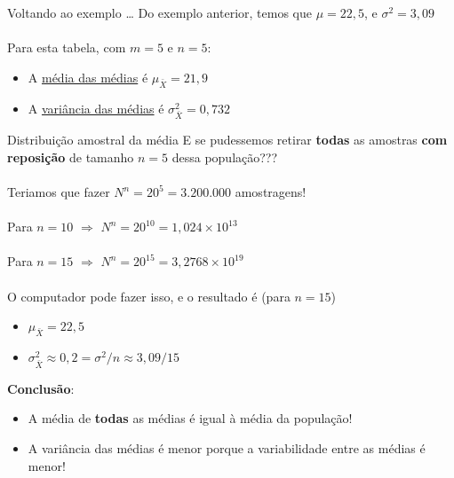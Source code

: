 \documentclass[10pt]{beamer}\usepackage[]{graphicx}\usepackage[]{color}
\theoremstyle{definition}
\begin{document}
\begin{frame}{Voltando ao exemplo \ldots}
  Do exemplo anterior, temos que $\mu = 22,5$, e $\sigma^2 = 3,09$\\~\\
  Para esta tabela, com $m=5$ e $n=5$:
  \begin{itemize}
  \item A \underline{média das médias} é $\mu_{\bar{X}} = 21,9$
  \item A \underline{variância das médias} é $\sigma^2_{\bar{X}} = 0,732$
  \end{itemize}
\end{frame}

\begin{frame}[fragile=singleslide]{Distribuição amostral da média}
  E se pudessemos retirar \textbf{todas} as amostras \textbf{com
    reposição} de tamanho $n=5$ dessa população??? \\~\\
  Teriamos que fazer $N^n = 20^5 = 3.200.000$ amostragens! \\~\\
  Para $n=10$ $\Rightarrow$ $N^n = 20^{10} = 1,024 \times 10^{13}$ \\~\\
  Para $n=15$ $\Rightarrow$ $N^n = 20^{15} = 3,2768 \times 10^{19}$ \\~\\
  O computador pode fazer isso, e o resultado é (para $n=15$)
  \begin{itemize}
  \item $\mu_{\bar{X}} = 22,5$
  \item $\sigma^2_{\bar{X}} \approx 0,2 = \sigma^2/n \approx 3,09/15$
  \end{itemize}
  \vspace{1em}
  \textbf{Conclusão}:
  \begin{itemize}
  \item A média de \textbf{todas} as médias é igual à média da
    população!
  \item A variância das médias é menor porque a variabilidade
    entre as médias é menor!
  \end{itemize}
\end{frame}
\end{document}
